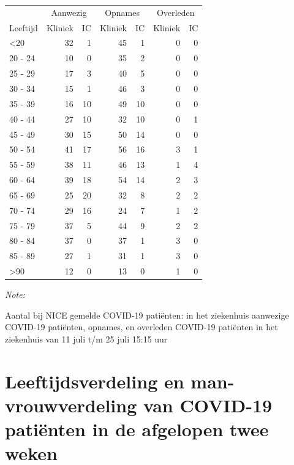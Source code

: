 \documentclass[
  english,
  man,floatsintext]{apa6}
\begin{document}
\begin{table}
\centering\begingroup\fontsize{10}{12}\selectfont

\begin{threeparttable}
\begin{tabular}{lrrrrrr}
\toprule
\multicolumn{1}{c}{ } & \multicolumn{2}{c}{Aanwezig} & \multicolumn{2}{c}{Opnames} & \multicolumn{2}{c}{Overleden} \\
\cmidrule(l{3pt}r{3pt}){2-3} \cmidrule(l{3pt}r{3pt}){4-5} \cmidrule(l{3pt}r{3pt}){6-7}
Leeftijd & Kliniek & IC & Kliniek & IC & Kliniek & IC\\
\midrule
<20 & 32 & 1 & 45 & 1 & 0 & 0\\
20 - 24 & 10 & 0 & 35 & 2 & 0 & 0\\
25 - 29 & 17 & 3 & 40 & 5 & 0 & 0\\
30 - 34 & 15 & 1 & 46 & 3 & 0 & 0\\
35 - 39 & 16 & 10 & 49 & 10 & 0 & 0\\
40 - 44 & 27 & 10 & 32 & 10 & 0 & 1\\
45 - 49 & 30 & 15 & 50 & 14 & 0 & 0\\
50 - 54 & 41 & 17 & 56 & 16 & 3 & 1\\
55 - 59 & 38 & 11 & 46 & 13 & 1 & 4\\
60 - 64 & 39 & 18 & 54 & 14 & 2 & 3\\
65 - 69 & 25 & 20 & 32 & 8 & 2 & 2\\
70 - 74 & 29 & 16 & 24 & 7 & 1 & 2\\
75 - 79 & 37 & 5 & 44 & 9 & 2 & 2\\
80 - 84 & 37 & 0 & 37 & 1 & 3 & 0\\
85 - 89 & 27 & 1 & 31 & 1 & 3 & 0\\
>90 & 12 & 0 & 13 & 0 & 1 & 0\\
\bottomrule
\end{tabular}
\begin{tablenotes}
\item \textit{Note: } 
\item Aantal bij NICE gemelde COVID-19 patiënten: in het ziekenhuis aanwezige COVID-19 patiënten, opnames, en overleden COVID-19 patiënten in het ziekenhuis van 11 juli t/m 25 juli 15:15 uur
\end{tablenotes}
\end{threeparttable}
\endgroup{}
\end{table}

\newpage

\hypertarget{leeftijdsverdeling-en-man-vrouwverdeling-van-covid-19-patiuxebnten-in-de-afgelopen-twee-weken}{%
\section{Leeftijdsverdeling en man-vrouwverdeling van COVID-19 patiënten in de afgelopen twee weken}\label{leeftijdsverdeling-en-man-vrouwverdeling-van-covid-19-patiuxebnten-in-de-afgelopen-twee-weken}}
\end{document}
